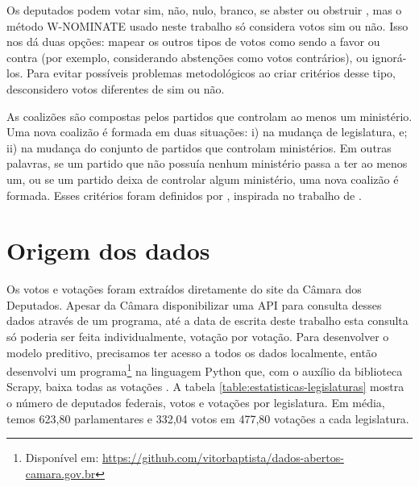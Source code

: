 \documentclass[a4paper,titlepage]{ppgi}\usepackage[]{graphicx}\usepackage[]{color}
\begin{document}

Os deputados podem votar sim, não, nulo, branco, se abster ou obstruir
\cite{Carneiro2013}, mas o método W-NOMINATE usado neste trabalho só considera
votos sim ou não. Isso nos dá duas opções: mapear os outros tipos de votos como
sendo a favor ou contra (por exemplo, considerando abstenções como votos
contrários), ou ignorá-los. Para evitar possíveis problemas metodológicos ao
criar critérios desse tipo, desconsidero votos diferentes de sim ou não.


As coalizões são compostas pelos partidos que controlam ao menos um ministério.
Uma nova coalizão é formada em duas situações: i) na mudança de legislatura, e;
ii) na mudança do conjunto de partidos que controlam ministérios. Em outras
palavras, se um partido que não possuía nenhum ministério passa a ter ao menos
um, ou se um partido deixa de controlar algum ministério, uma nova coalizão é
formada. Esses critérios foram definidos por ,
inspirada no trabalho de .


\section{Origem dos dados}




Os votos e votações foram extraídos diretamente do site da Câmara dos
Deputados. Apesar da Câmara disponibilizar uma \gls{API} para consulta desses
dados através de um programa, até a data de escrita deste trabalho esta
consulta só poderia ser feita individualmente, votação por votação. Para
desenvolver o modelo preditivo, precisamos ter acesso a todos os dados
localmente, então desenvolvi um programa\footnote{Disponível em:
\url{https://github.com/vitorbaptista/dados-abertos-camara.gov.br}} na
linguagem Python que, com o auxílio da biblioteca Scrapy, baixa todas as
votações \cite{Python276,Scrapy}. A tabela
\ref{table:estatisticas-legislaturas} mostra o número de deputados federais,
votos e votações por legislatura. Em média, temos 623,80
parlamentares e 332,04 votos em
477,80 votações a cada legislatura.
\nocite{CamaraDosDeputados2015}
\end{document}
